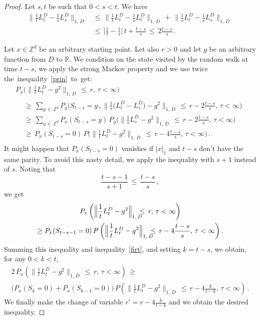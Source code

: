 \documentclass[AHL, Unicode, longabstracts, published]{cedram}
\newcommand*\Zd {{\mathbb Z^d}}
\newcommand*\R{\mathbb{R}}
\begin{document}
\begin{proof}
Let $s,t$ be such that $0<s<t$. We have
\begin{equation}\label{prin}
\begin{aligned}
\Big\|\frac{1}{t}L_t^D-
\frac{1}{s}L_s^D\Big\|_{1,\,D}\,&\leq\,
\Big\|\frac{1}{t}L_t^D-
\frac{1}{s}L_t^D\Big\|_{1,\,D}\,+\,
\Big\|\frac{1}{s}L_t^D-
\frac{1}{s}L_s^D\Big\|_{1,\,D}\,\\
&\leq\,
\Big|\frac{1}{t} -\frac{1}{s}\Big|\,t+\frac{t-s}{s}\,\leq\, 2\frac{t-s}{s}
\,.
\end{aligned}
\end{equation}


Let $x\in\Zd$ be an arbitrary starting point. Let also $r>0$ and let $g$ be an arbitrary function from $D$ to $\R$. We condition on the state visited by the random walk at time $t-s$, we apply the strong Markov property and we use twice the~inequality~\eqref{prin}~to~get:
\begin{multline}\label{firt}
P_x\Big(
\Big\|\frac{1}{t}L_t^D-g^2
\Big\|_{1,\,D}
\,\leq\,r,\,\tau<\infty
\Big)
\\
\begin{aligned}
&\geq\,
\sum_{y\,\in\,\Zd} P_y\Big(S_{t-s}=y\,,
\Big\|
\frac{1}{s}\big(L_t^D- L_s^D\big)-g^2
\Big\|_{1,\,D}\,\leq\,r -2\frac{t-s}{s},\,\tau<\infty
\Big)\\
&\geq\,
\sum_{y\,\in\,\Zd} P_x(S_{t-s}=y)\, P_y\Big(
\Big\|\frac{1}{s}L_s^D-g^2
\Big\|_{1,\,D}\,\leq\,r -2\frac{t-s}{s},\,\tau<\infty
\Big)\\
&\geq\, P_x(S_{t-s}=0)\, P\Big(
\Big\|\frac{1}{t}L_t^D-g^2
\Big\|_{1,\,D}\,\leq\,r -4\frac{t-s}{s},\,\tau<\infty
\Big)\,.
\end{aligned}
\end{multline}
It might happen that $P_x(S_{t-s}=0)$ vanishes if $|x|_{1}$ and $t-s$ don't have the same parity. To avoid this nasty detail, we apply the inequality with $s+1$ instead of $s$. Noting that
\[
\frac{t-s-1}{s+1}\,\leq\,\frac{t-s}{s}\,,
\]
we get
\begin{multline*}
P_x\left(
\Big\|\frac{1}{t}L_t^D-g^2
\Big\|_{1,\,D}
\kern-7pt
\leq\,r,\,\tau<\infty
\right)\\
\geq P_x(S_{t-s-1}=0)\, P\left(
\Big\|\frac{1}{t}L_t^D-g^2
\Big\|_{1,\,D}
\kern-7pt
\leq\, r -4\frac{t-s}{s},\,\tau<\infty
\right).
\end{multline*}
Summing this inequality and inequality~\eqref{firt}, and setting $k=t-s$, we obtain, for any $0<k<t$,
\begin{multline*}
2\,P_x\left(
\Big\|\frac{1}{t}L_t^D-g^2
\Big\|_{1,\,D}\,\leq\,r,\,\tau<\infty
\right)
\,\geq\,\\
\big(P_x(S_{k}=0)+ P_x(S_{k-1}=0)\big)\, P\left(
\Big\|\frac{1}{t}L_t^D-g^2
\Big\|_{1,\,D}\,\leq\,r -4\frac{k}{t-k},\,\tau<\infty
\right)\,.
\end{multline*}
We finally make the change of variable $r'=r -4\frac{k}{t-k}$ and we obtain the desired inequality.
\end{proof}
\end{document}
